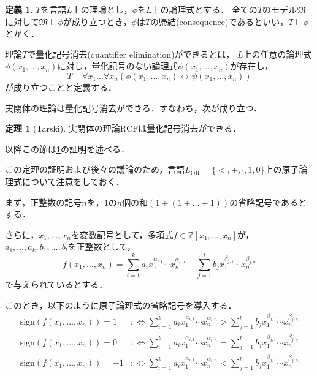 \documentclass[uplatex, dvipdfmx]{jsarticle}
\newcommand{\Z}{\mathbb{Z}}
\newcommand{\M}{\mathfrak{M}}
\newcommand{\defiff}{ :\Leftrightarrow}
\newcommand{\RCF}{\mathrm{RCF}}
\newcommand{\sign}{\mathrm{sign}}
\theoremstyle{definition}
\newtheorem{definition}{定義}[section]
\newtheorem{theorem}{定理}[section]
\begin{document}
\begin{definition}
$T$を言語$L$上の理論とし，$\phi$を$L$上の論理式とする．%
全ての$T$のモデル$\M$に対して$\M \models \phi$が成り立つとき，$\phi$は$T$の帰結(consequence)であるといい，$T \models \phi$とかく．

理論$T$で量化記号消去(quantifier elimination)ができるとは，
$L$上の任意の論理式$\phi(x_1,\dots,x_n)$に対し，量化記号のない論理式$\psi(x_1,\dots, x_n)$が存在し，
\begin{equation*}
     T \models \forall x_1 \dots \forall x_n(\phi(x_1,\dots,x_n) \leftrightarrow \psi(x_1, \dots, x_n))
\end{equation*}
が成り立つことと定義する．
\end{definition}


実閉体の理論は量化記号消去ができる．すなわち，次が成り立つ．

\begin{theorem}[Tarski]\label{theorem:Tarski}
     実閉体の理論$\RCF$は量化記号消去ができる．
\end{theorem}

以降この節は\cref{theorem:Tarski}の証明を述べる．

この定理の証明および後々の議論のため，言語$L_\mathrm{OR} = \{<, +, \cdot, 1, 0\}$上の原子論理式について注意をしておく．

まず，正整数の記号$n$を，$1$の$n$個の和$(1 + (1 + \dots + 1 ))$の省略記号であるとする．

さらに，$x_1, \dots, x_n$を変数記号として，多項式$f \in \Z[x_1, \dots, x_n]$が，$a_1, \dots, a_k, b_1, \dots, b_l$を正整数として，
\[
     f(x_1, \dots, x_n) = \sum_{i=1}^k a_i x_1^{\alpha_{i,1}} \cdots x_n^{\alpha_{i,n}} - \sum_{j=1}^l b_j x_1^{\beta_{j,1}} \cdots x_n^{\beta_{j,n}}
\]
で与えられているとする．

このとき，以下のように原子論理式の省略記号を導入する．
\begin{align*}
     \sign (f(x_1, \dots, x_n)) = 1 &\defiff \sum_{i=1}^k a_i x_1^{\alpha_{i,1}} \cdots x_n^{\alpha_{i,n}} > \sum_{j=1}^l b_j x_1^{\beta_{j,1}} \cdots x_n^{\beta_{j,n}}\\
     \sign (f(x_1, \dots, x_n)) = 0 &\defiff \sum_{i=1}^k a_i x_1^{\alpha_{i,1}} \cdots x_n^{\alpha_{i,n}} = \sum_{j=1}^l b_j x_1^{\beta_{j,1}} \cdots x_n^{\beta_{j,n}}\\
     \sign (f(x_1, \dots, x_n)) = -1 &\defiff \sum_{i=1}^k a_i x_1^{\alpha_{i,1}} \cdots x_n^{\alpha_{i,n}} < \sum_{j=1}^l b_j x_1^{\beta_{j,1}} \cdots x_n^{\beta_{j,n}}
\end{align*}
\end{document}
